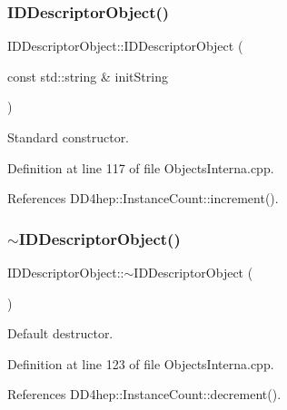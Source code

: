 \subsubsection{\texorpdfstring{I\+D\+Descriptor\+Object()}{IDDescriptorObject()}\hspace{0.1cm}{\footnotesize\ttfamily [2/2]}}
{\footnotesize\ttfamily I\+D\+Descriptor\+Object\+::\+I\+D\+Descriptor\+Object (\begin{DoxyParamCaption}\item[{const std\+::string \&}]{init\+String }\end{DoxyParamCaption})}



Standard constructor. 



Definition at line 117 of file Objects\+Interna.\+cpp.



References D\+D4hep\+::\+Instance\+Count\+::increment().

\hypertarget{class_d_d4hep_1_1_geometry_1_1_i_d_descriptor_object_ab2e22dcf33d24f258e82973d9851474d}{}\label{class_d_d4hep_1_1_geometry_1_1_i_d_descriptor_object_ab2e22dcf33d24f258e82973d9851474d} 
\subsubsection{\texorpdfstring{$\sim$\+I\+D\+Descriptor\+Object()}{~IDDescriptorObject()}}
{\footnotesize\ttfamily I\+D\+Descriptor\+Object\+::$\sim$\+I\+D\+Descriptor\+Object (\begin{DoxyParamCaption}{ }\end{DoxyParamCaption})\hspace{0.3cm}{\ttfamily [virtual]}}



Default destructor. 



Definition at line 123 of file Objects\+Interna.\+cpp.



References D\+D4hep\+::\+Instance\+Count\+::decrement().




